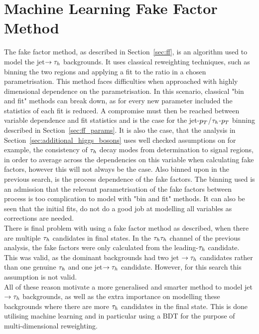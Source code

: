 \section{Machine Learning Fake Factor Method}
\label{sec:ml_ff}

The fake factor method, as described in Section~\ref{sec:ff}, is an algorithm used to model the jet$\rightarrow \tau_{h}$ backgrounds.
It uses classical reweighting techniques, such as binning the two regions and applying a fit to the ratio in a chosen parametrisation.
This method faces difficulties when approached with highly dimensional dependence on the parametrisation.
In this scenario, classical "bin and fit" methods can break down, as for every new parameter included the statistics of each fit is reduced.
A compromise must then be reached between variable dependence and fit statistics and is the case for the jet-$p_{T}$/$\tau_{h}$-$p_{T}$ binning described in Section~\ref{sec:ff_params}.
It is also the case, that the analysis in Section~\ref{sec:additional_higgs_bosons} uses well checked assumptions on for example, the consistency of $\tau_{h}$ decay modes from determination to signal regions, in order to average across the dependencies on this variable when calculating fake factors, however this will not always be the case.
Also binned upon in the previous search, is the process dependence of the fake factors.
The binning used is an admission that the relevant parametrisation of the fake factors between process is too complication to model with "bin and fit" methods.
It can also be seen that the initial fits, do not do a good job at modelling all variables as corrections are needed. \\

There is final problem with using a fake factor method as described, when there are multiple $\tau_{h}$ candidates in final states. 
In the $\tau_{h}\tau_{h}$ channel of the previous analysis, the fake factors were only calculated from the leading-$\tau_{h}$ candidate.
This was valid, as the dominant backgrounds had two jet $\rightarrow\tau_{h}$ candidates rather than one genuine $\tau_{h}$ and one jet$\rightarrow\tau_{h}$ candidate.
However, for this search this assumption is not valid. \\

All of these reason motivate a more generalised and smarter method to model jet $\rightarrow\tau_{h}$ backgrounds, as well as the extra importance on modelling these backgrounds where there are more $\tau_{h}$ candidates in the final state.
This is done utilising machine learning and in particular using a BDT for the purpose of multi-dimensional reweighting. \\ 

